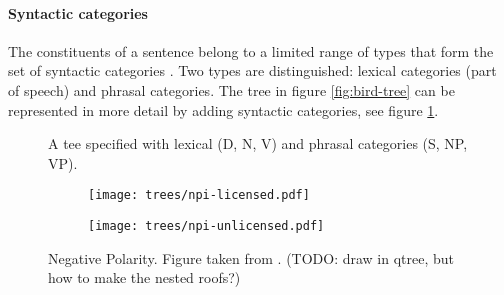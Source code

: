 \paragraph{Syntactic categories} The constituents of a sentence belong to a limited range of types that form the set of syntactic categories \citep{huddleston2002grammar}. Two types are distinguished: lexical categories (part of speech) and phrasal categories. The tree in figure \ref{fig:bird-tree} can be represented in more detail by adding syntactic categories, see figure \ref{fig:bird-tree-labeled}.
\begin{figure}[h]{\textwidth}
  \center
  \caption{A tee specified with lexical (D, N, V) and phrasal categories (S, NP, VP).}
  \label{fig:bird-tree-labeled}
\end{figure}

\begin{figure}[b]
  \begin{subfigure}[b]{0.5\textwidth}
		\texttt{[image: trees/npi-licensed.pdf]}
    \label{fig:tree-npi-licensed}
	\end{subfigure}
	\begin{subfigure}[b]{0.5\textwidth}
		\texttt{[image: trees/npi-unlicensed.pdf]}
    \label{fig:tree-npi-unlicensed}
	\end{subfigure}
\caption{Negative Polarity. Figure taken from \cite{Everaert+2015:structures}. (TODO: draw in qtree, but how to make the nested roofs?)}
\label{fig:trees-npi}
\end{figure}

